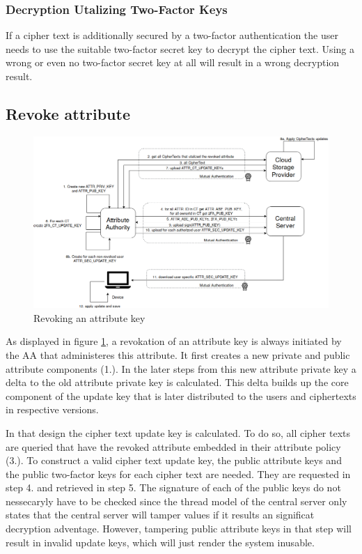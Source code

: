 \subsubsection{Decryption Utalizing Two-Factor Keys}
If a cipher text is additionally secured by a two-factor authentication the user needs to use the suitable two-factor secret key to decrypt the cipher text. Using a wrong or even no two-factor secret key at all will result in a wrong decryption result.

\subsection{Revoke attribute}
\begin{figure}[!t]
\centering
    \includegraphics[width=1.0\linewidth]{img/attribute_revokation.png}
    \caption{Revoking an attribute key}
    \label{fig:tfdacmacs-attribute-revokation}
\end{figure}

As displayed in figure \ref{fig:tfdacmacs-attribute-revokation}, a revokation of an attribute key is always initiated by the AA that administeres this attribute. It first creates a new private and public attribute components (1.). In the later steps from this new attribute private key a delta to the old attribute private key is calculated. This delta builds up the core component of the update key that is later distributed to the users and ciphertexts in respective versions. 

In that design the cipher text update key is calculated. To do so, all cipher texts are queried that have the revoked attribute embedded in their attribute policy (3.). To construct a valid cipher text update key, the public attribute keys and the public two-factor keys for each cipher text are needed. They are requested in step 4. and retrieved in step 5. The signature of each of the public keys do not nessecaryly have to be checked since the thread model of the central server only states that the central server will tamper values if it results an significat decryption adventage. However, tampering public attribute keys in that step will result in invalid update keys, which will just render the system inusable. 

